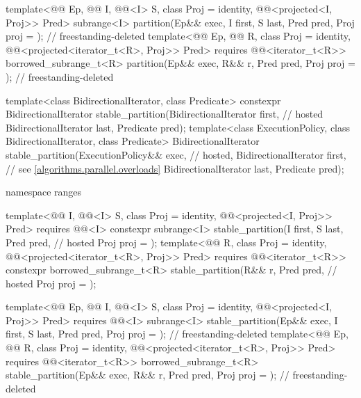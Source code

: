 \begin{codeblock}
{{    template<@@ Ep, @@ I, @@<I> S,
             class Proj = identity, @@<projected<I, Proj>> Pred>
      subrange<I>
        partition(Ep&& exec, I first, S last, Pred pred, Proj proj = {});   // freestanding-deleted
    template<@@ Ep, @@ R, class Proj = identity,
             @@<projected<iterator_t<R>, Proj>> Pred>
      requires @@<iterator_t<R>>
      borrowed_subrange_t<R>
        partition(Ep&& exec, R&& r, Pred pred, Proj proj = {});             // freestanding-deleted
  }

  template<class BidirectionalIterator, class Predicate>
    constexpr BidirectionalIterator stable_partition(BidirectionalIterator first,   // hosted
                                                     BidirectionalIterator last,
                                                     Predicate pred);
  template<class ExecutionPolicy, class BidirectionalIterator, class Predicate>
    BidirectionalIterator stable_partition(ExecutionPolicy&& exec,                  // hosted,
                                           BidirectionalIterator first,             // see \ref{algorithms.parallel.overloads}
                                           BidirectionalIterator last,
                                           Predicate pred);

  namespace ranges {
    template<@@ I, @@<I> S, class Proj = identity,
             @@<projected<I, Proj>> Pred>
      requires @@<I>
      constexpr subrange<I> stable_partition(I first, S last, Pred pred,            // hosted
                                             Proj proj = {});
    template<@@ R, class Proj = identity,
             @@<projected<iterator_t<R>, Proj>> Pred>
      requires @@<iterator_t<R>>
      constexpr borrowed_subrange_t<R> stable_partition(R&& r, Pred pred,           // hosted
                                                        Proj proj = {});

    template<@@ Ep, @@ I, @@<I> S,
             class Proj = identity, @@<projected<I, Proj>> Pred>
      requires @@<I>
      subrange<I>
        stable_partition(Ep&& exec, I first, S last, Pred pred,
                         Proj proj = {});                                   // freestanding-deleted
    template<@@ Ep, @@ R, class Proj = identity,
             @@<projected<iterator_t<R>, Proj>> Pred>
      requires @@<iterator_t<R>>
      borrowed_subrange_t<R>
        stable_partition(Ep&& exec, R&& r, Pred pred, Proj proj = {});      // freestanding-deleted
  }

}
\end{codeblock}
